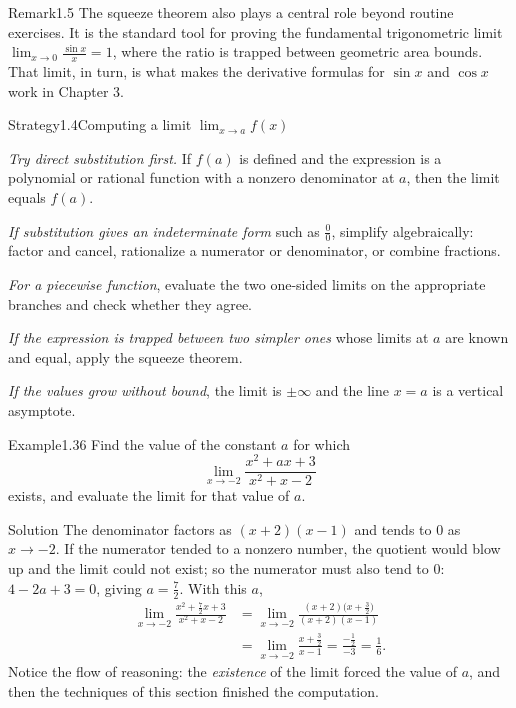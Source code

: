 \documentclass[a4paper,12pt,oneside]{memoir}
\begin{document}
\begin{envremark}{Remark}{1.5}{}
The squeeze theorem also plays a central role beyond routine exercises. It is the standard tool for proving the fundamental trigonometric limit \(\lim_{x \to 0} \frac{\sin x}{x} = 1\), where the ratio is trapped between geometric area bounds. That limit, in turn, is what makes the derivative formulas for \(\sin x\) and \(\cos x\) work in Chapter 3.
\end{envremark}
\begin{envstrategy}{Strategy}{1.4}{Computing a limit \(\lim_{x \to a} f(x)\)}
\begin{steps}
  \item \emph{Try direct substitution first.} If \(f(a)\) is defined and the expression is a polynomial or rational function with a nonzero denominator at \(a\), then the limit equals \(f(a)\).
  \item \emph{If substitution gives an indeterminate form} such as \(\tfrac{0}{0}\), simplify algebraically: factor and cancel, rationalize a numerator or denominator, or combine fractions.
  \item \emph{For a piecewise function}, evaluate the two one-sided limits on the appropriate branches and check whether they agree.
  \item \emph{If the expression is trapped between two simpler ones} whose limits at \(a\) are known and equal, apply the squeeze theorem.
  \item \emph{If the values grow without bound}, the limit is \(\pm\infty\) and the line \(x = a\) is a vertical asymptote.
\end{steps}
\end{envstrategy}
\begin{workedexample}
\begin{envexample}{Example}{1.36}{}
Find the value of the constant \(a\) for which \[ \lim_{x \to -2} \frac{x^{2} + a x + 3}{x^{2} + x - 2} \] exists, and evaluate the limit for that value of \(a\).
\end{envexample}
\begin{envsolution}{Solution}{}{}
The denominator factors as \((x + 2)(x - 1)\) and tends to \(0\) as \(x \to -2\). If the numerator tended to a nonzero number, the quotient would blow up and the limit could not exist; so the numerator must also tend to \(0\): \(4 - 2a + 3 = 0\), giving \(a = \tfrac{7}{2}\). With this \(a\), \[ \begin{aligned} \lim_{x \to -2} \frac{x^{2} + \tfrac{7}{2}x + 3}{x^{2} + x - 2} &= \lim_{x \to -2} \frac{(x + 2)\bigl(x + \tfrac{3}{2}\bigr)}{(x + 2)(x - 1)} \\ &= \lim_{x \to -2} \frac{x + \tfrac{3}{2}}{x - 1} = \frac{-\tfrac{1}{2}}{-3} = \frac{1}{6}. \end{aligned} \] Notice the flow of reasoning: the \emph{existence} of the limit forced the value of \(a\), and then the techniques of this section finished the computation.
\end{envsolution}
\end{workedexample}
\end{document}
